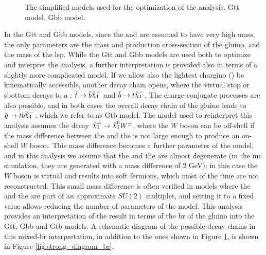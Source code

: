 \begin{figure}[h]
\centering 
{}
\caption{The simplified models used for the optimization of the analysis.  Gtt model.  Gbb model.
}\label{fig:strong_diagram}
\end{figure}

In the Gtt and Gbb models, since the \stop and \sbottom are assumed to have very high mass, the only parameters are the mass and production cross-section of the gluino, and the mass of the \gls{lsp}. While the Gtt and Gbb models are used both to optimize and interpret the analysis, a further interpretation is provided also in terms of a slightly more complicated model. If we allow also the lightest chargino (\chinoonepm) be kinematically accessible, another decay chain opens, where the virtual stop or sbottom decays to a \chinoonepm:
$\stop \to \bar{b} \chinoonem$ and 
$\sbottom \to t \chinoonem$.
The charge-conjugate processes are also possible, and in both cases the overall decay chain of the gluino leads to $\gluino \to t b \chinoonem$, which we refer to as Gtb model.
The model used to reinterpret this analysis assumes the decay $\chinoonepm \to \ninoone W^{\pm}$, where the $W$ boson can be off-shell if the mass difference between the \chinoonepm and the \ninoone is not large enough to produce an on-shell $W$ boson. 
This mass difference becomes a further parameter of the model, and in this analysis we assume that the \chinoonepm and the \ninoone 
are almost degenerate (in the \gls{mc} simulation, they are generated with a mass difference of 2 GeV); in this case the $W$ boson is virtual and results into soft fermions, which most of the time are not reconstructed. This small mass difference is often verified in models where the \chinoonepm and the \ninoone are part of an approximate $SU(2)$ multiplet, and setting it to a fixed value allows reducing the number of parameters of the model. 
This analysis provides an interpretation of the result in terms of the \gls{br} of the gluino into the Gtt, Gbb and Gtb models. 
A schematic diagram of the possible decay chains in this mixed-\gls{br} interpretation, in addition to the ones shown in Figure \ref{fig:strong_diagram}, is shown in Figure \ref{fig:strong_diagram_br}.

